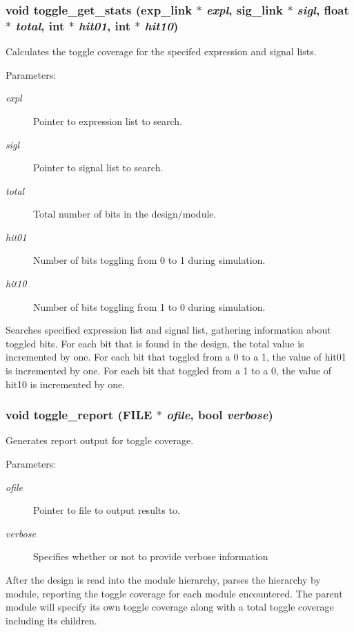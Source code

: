 \subsubsection{\setlength{\rightskip}{0pt plus 5cm}void toggle\_\-get\_\-stats ({\bf exp\_\-link} $\ast$ {\em expl}, {\bf sig\_\-link} $\ast$ {\em sigl}, float $\ast$ {\em total}, int $\ast$ {\em hit01}, int $\ast$ {\em hit10})}\label{toggle_8h_a0}


Calculates the toggle coverage for the specifed expression and signal lists. 

\begin{Desc}
\item[Parameters:]
\begin{description}
\item[{\em expl}]Pointer to expression list to search. \item[{\em sigl}]Pointer to signal list to search. \item[{\em total}]Total number of bits in the design/module. \item[{\em hit01}]Number of bits toggling from 0 to 1 during simulation. \item[{\em hit10}]Number of bits toggling from 1 to 0 during simulation.\end{description}
\end{Desc}
Searches specified expression list and signal list, gathering information about toggled bits. For each bit that is found in the design, the total value is incremented by one. For each bit that toggled from a 0 to a 1, the value of hit01 is incremented by one. For each bit that toggled from a 1 to a 0, the value of hit10 is incremented by one. 
\subsubsection{\setlength{\rightskip}{0pt plus 5cm}void toggle\_\-report (FILE $\ast$ {\em ofile}, {\bf bool} {\em verbose})}\label{toggle_8h_a1}


Generates report output for toggle coverage. 

\begin{Desc}
\item[Parameters:]
\begin{description}
\item[{\em ofile}]Pointer to file to output results to. \item[{\em verbose}]Specifies whether or not to provide verbose information\end{description}
\end{Desc}
After the design is read into the module hierarchy, parses the hierarchy by module, reporting the toggle coverage for each module encountered. The parent module will specify its own toggle coverage along with a total toggle coverage including its children. 